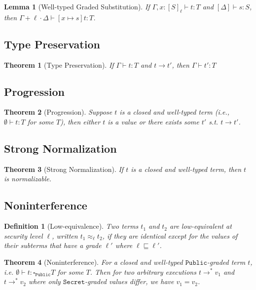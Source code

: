 \documentclass[conference]{IEEEtran}
\newcommand\gradedt[2]{\square_#1 #2}
\newcommand\public{\texttt{Public}}
\newcommand\secret{\texttt{Secret}}
\newtheorem{definition}{Definition}
\newtheorem{theorem}{Theorem}
\newtheorem{lemma}{Lemma}
\begin{document}
\begin{lemma}[Well-typed Graded Substitution] 
	If $\Gamma,x:[S]_\ell\vdash t:T$ and $[\Delta]\vdash s:S$, then $\Gamma+\ell\cdot\Delta\vdash [x\mapsto s]t:T$.
\end{lemma}

\subsection{Type Preservation}
\label{thm-pre}
\begin{theorem}[Type Preservation]
	If $\Gamma\vdash t:T$ and $t\to t'$, then $\Gamma\vdash t':T$
\end{theorem}

\subsection{Progression}
\label{thm-pro}
\begin{theorem}[Progression]
	Suppose $t$ is a closed and well-typed  term (i.e., $\emptyset\vdash t:T$ for some $T$), then either $t$ is a value or there exists some $t'$ s.t. $t\to t'$.
\end{theorem}

\subsection{Strong Normalization}
\label{thm-sn}
\begin{theorem}[Strong Normalization]
	If $t$ is a closed and well-typed  term, then $t$ is normalizable.
\end{theorem}

\subsection{Noninterference}
\begin{definition}[Low-equivalence]
	Two terms $t_1$	and $t_2$ are low-equivalent at security level $\ell$, written $t_1\approx_\ell t_2$, if they are identical except for the values of their subterms that have a grade $\ell'$ where $\ell\sqsubseteq\ell'$.	
\end{definition}
\label{thm-noninterference}
\begin{theorem}[Noninterference]
	For a closed and well-typed $\public$-graded term $t$, i.e. $\emptyset\vdash t:\gradedt{\public}{T}$ for some $T$. Then for two arbitrary executions $t\to^* v_1$ and $t\to^* v_2$ where only $\secret$-graded values differ, we have $v_1=v_2$.
\end{theorem}
\end{document}
